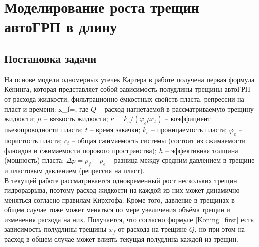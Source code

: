 \chapter{Моделирование роста трещин автоГРП в длину} \label{ch3}

\section{Постановка задачи}
\vspace*{-5mm}

На основе модели одномерных утечек Картера \cite{karter} в работе \cite{koning} получена первая формула Кёнинга, которая представляет собой зависимость полудлины трещины автоГРП от расхода жидкости, фильтрационно-ёмкостных свойств пласта, репрессии на пласт и времени:
\beq\label{Koning_first}
x_{\!f}=,
\eeq
где $Q$ -- расход нагнетаемой в рассматриваемую трещину жидкости;
$\mu$ -- вязкость жидкости;
$\kappa=k_e/(\varphi_e\mu c_t)$ -- коэффициент пьезопроводности пласта;
$t$ -- время закачки;
$k_e$ -- проницаемость пласта;
$\varphi_e$ -- пористость пласта;
$c_t$ -- общая сжимаемость системы (состоит из сжимаемости флюидов и сжимаемости порового пространства);
$h$ -- эффективная толщина (мощность) пласта;
$\Delta p=p_{\!f}-p_e$ -- разница между средним давлением в трещине и пластовым давлением (репрессия на пласт).\\

В текущей работе рассматривается одновременный рост нескольких трещин гидроразрыва, поэтому расход жидкости на каждой из них может динамично меняться согласно правилам Кирхгофа.
Кроме того, давление в трещинах в общем случае тоже может меняться по мере увеличения объёма трещин и изменения расхода на них.
Получается, что согласно формуле \eqref{Koning_first} есть зависимость полудлины трещины $x_f$ от расхода на трещине $Q$, но при этом на расход в общем случае может влиять текущая полудлина каждой из трещин.

